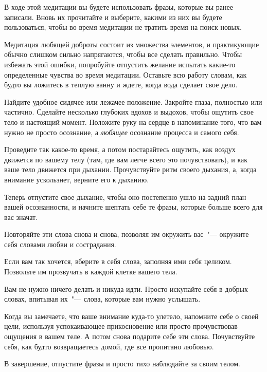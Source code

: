 В ходе этой медитации вы будете использовать фразы, которые вы ранее записали. Вновь их прочитайте и выберите, какими из них вы будете пользоваться, чтобы во время медитации не тратить время на поиск новых. 

Медитация любящей доброты состоит из множества элементов, и практикующие обычно слишком сильно напрягаются, чтобы все сделать правильно. Чтобы избежать этой ошибки, попробуйте отпустить желание испытать какие-то определенные чувства во время медитации. Оставьте всю работу словам, как будто вы ложитесь в теплую ванну и ждете, когда вода сделает свое дело. 

\begin{itemize}
	\itemdiamondsuit Найдите удобное сидячее или лежачее положение. Закройте глаза, полностью или частично. Сделайте несколько глубоких вдохов и выдохов, чтобы ощутить свое тело и настоящий момент. Положите руку на сердце в напоминание того, что вам нужно не просто осознание, а \emph{любящее} осознание процесса и самого себя.
	
	\itemdiamondsuit Проведите так какое-то время, а потом постарайтесь ощутить, как воздух движется по вашему телу (там, где вам легче всего это почувствовать), и как ваше тело движется при дыхании. Прочувствуйте ритм своего дыхания, а, когда внимание ускользнет, верните его к дыханию.
	
	\itemdiamondsuit Теперь отпустите свое дыхание, чтобы оно постепенно ушло на задний план вашей осознанности, и начните шептать себе те фразы, которые больше всего для вас значат.
	
	\itemdiamondsuit Повторяйте эти слова снова и снова, позволяя им окружить вас~"--- окружите себя словами любви и сострадания.
	
	\itemdiamondsuit Если вам так хочется, вберите в себя слова, заполняя ими себя целиком. Позвольте им прозвучать в каждой клетке вашего тела.
	
	\itemdiamondsuit Вам не нужно ничего делать и никуда идти. Просто искупайте себя в добрых словах, впитывая их~"--- слова, которые вам нужно услышать.
	
	\itemdiamondsuit Когда вы замечаете, что ваше внимание куда-то улетело, напомните себе о своей цели, используя успокаивающее прикосновение или просто прочувствовав ощущения в вашем теле. А потом снова подарите себе эти слова. Почувствуйте себя, как будто возвращаетесь домой, где все пропитано любовью.
	
	\itemdiamondsuit В завершение, отпустите фразы и просто тихо наблюдайте за своим телом.
\end{itemize}

